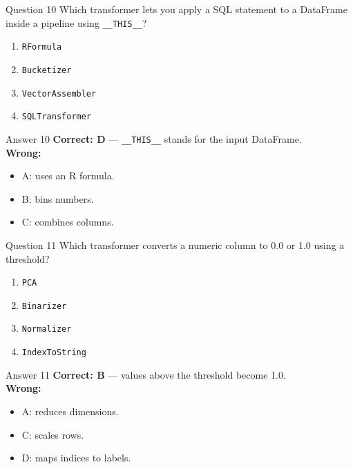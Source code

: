 \documentclass[aspectratio=169,11pt]{beamer}
\begin{document}
\begin{frame}{Question 10}
Which transformer lets you apply a SQL statement to a DataFrame inside a pipeline using \texttt{\_\_THIS\_\_}?
\begin{enumerate}[label=\Alph*.]
\item \texttt{RFormula}
\item \texttt{Bucketizer}
\item \texttt{VectorAssembler}
\item \texttt{SQLTransformer}
\end{enumerate}
\end{frame}
\begin{frame}{Answer 10}
\textbf{Correct: D} --- \texttt{\_\_THIS\_\_} stands for the input DataFrame.\\
\vspace{0.5em}
\textbf{Wrong:}
\begin{itemize}
\item A: uses an R formula.
\item B: bins numbers.
\item C: combines columns.
\end{itemize}
\end{frame}

\begin{frame}{Question 11}
Which transformer converts a numeric column to 0.0 or 1.0 using a threshold?
\begin{enumerate}[label=\Alph*.]
\item \texttt{PCA}
\item \texttt{Binarizer}
\item \texttt{Normalizer}
\item \texttt{IndexToString}
\end{enumerate}
\end{frame}
\begin{frame}{Answer 11}
\textbf{Correct: B} --- values above the threshold become 1.0.\\
\vspace{0.5em}
\textbf{Wrong:}
\begin{itemize}
\item A: reduces dimensions.
\item C: scales rows.
\item D: maps indices to labels.
\end{itemize}
\end{frame}
\end{document}
